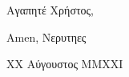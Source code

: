 \documentclass[a4paper,12pt]{article}
\begin{document}
    \pagestyle{plain}
    \rmfamily\normalsize
    \setlength{\parskip}{13pt}
    \setlength{\baselineskip}{17pt}
    \RaggedRight

    \normalsize

    Αγαπητέ Χρήστος,

    \lipsum[1]

    \lipsum[2]

    Amen,\newline
    Νερυτηες

    XX Αύγουστος MMXXI
\end{document}
